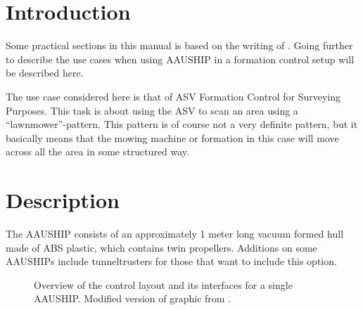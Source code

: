 \section{Introduction}

Some practical sections in this manual is based on the writing of
\cite{12gr730}. Going further to describe the use cases when using
AAUSHIP in a formation control setup will be described here.

The use case considered here is that of \ac{ASV} Formation Control for
Surveying Purposes. This task is about using the \ac{ASV} to scan an
area using a ``lawnmower''-pattern. This pattern is of course not a
very definite pattern, but it basically means that the mowing machine
or formation in this case will move across all the area in some structured way.

\section{Description} The AAUSHIP consists of an approximately 1 meter
long vacuum formed hull made of ABS plastic, which contains twin
propellers. Additions on some AAUSHIPs include tunneltrusters for
those that want to include this option.

\begin{figure}[htbp]
	
	\caption{Overview of the control layout and its interfaces for a
		single AAUSHIP.
		Modified version of graphic from \citep{12gr730}.}
	\label{fig:vessel-block-overview}
\end{figure}


